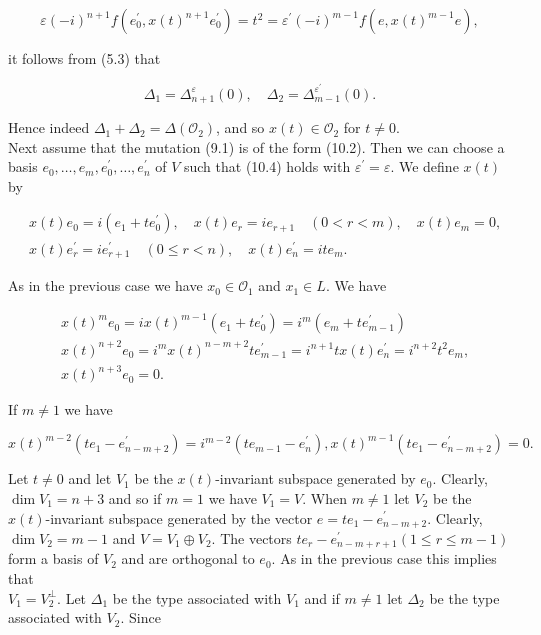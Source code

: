 \documentclass[10pt]{article}
\begin{document}
$$
\varepsilon(-i)^{n+1} f\left(e_{0}^{\prime}, x(t)^{n+1} e_{0}^{\prime}\right)=t^{2}=\varepsilon^{\prime}(-i)^{m-1} f\left(e, x(t)^{m-1} e\right),
$$

it follows from (5.3) that

$$
\Delta_{1}=\Delta_{n+1}^{\varepsilon}(0), \quad \Delta_{2}=\Delta_{m-1}^{\varepsilon^{\prime}}(0) .
$$

Hence indeed $\Delta_{1}+\Delta_{2}=\Delta\left(\mathcal{O}_{2}\right)$, and so $x(t) \in \mathcal{O}_{2}$ for $t \neq 0$.\\
Next assume that the mutation (9.1) is of the form (10.2). Then we can choose a basis $e_{0}, \ldots, e_{m}, e_{0}^{\prime}, \ldots, e_{n}^{\prime}$ of $V$ such that (10.4) holds with $\varepsilon^{\prime}=\varepsilon$. We define $x(t)$ by

$$
\begin{aligned}
& x(t) e_{0}=i\left(e_{1}+t e_{0}^{\prime}\right), \quad x(t) e_{r}=i e_{r+1} \quad(0<r<m), \quad x(t) e_{m}=0, \\
& x(t) e_{r}^{\prime}=i e_{r+1}^{\prime} \quad(0 \leqslant r<n), \quad x(t) e_{n}^{\prime}=i t e_{m} .
\end{aligned}
$$

As in the previous case we have $x_{0} \in \mathcal{O}_{1}$ and $x_{1} \in L$. We have

$$
\begin{aligned}
& x(t)^{m} e_{0}=i x(t)^{m-1}\left(e_{1}+t e_{0}^{\prime}\right)=i^{m}\left(e_{m}+t e_{m-1}^{\prime}\right) \\
& x(t)^{n+2} e_{0}=i^{m} x(t)^{n-m+2} t e_{m-1}^{\prime}=i^{n+1} t x(t) e_{n}^{\prime}=i^{n+2} t^{2} e_{m}, \\
& x(t)^{n+3} e_{0}=0 .
\end{aligned}
$$

If $m \neq 1$ we have

$$
x(t)^{m-2}\left(t e_{1}-e_{n-m+2}^{\prime}\right)=i^{m-2}\left(t e_{m-1}-e_{n}^{\prime}\right), x(t)^{m-1}\left(t e_{1}-e_{n-m+2}^{\prime}\right)=0 .
$$

Let $t \neq 0$ and let $V_{1}$ be the $x(t)$-invariant subspace generated by $e_{0}$. Clearly, $\operatorname{dim} V_{1}=n+3$ and so if $m=1$ we have $V_{1}=V$. When $m \neq 1$ let $V_{2}$ be the $x(t)$-invariant subspace generated by the vector $e=t e_{1}-e_{n-m+2}^{\prime}$. Clearly, $\operatorname{dim} V_{2}=m-1$ and $V=V_{1} \oplus V_{2}$. The vectors $t e_{r}-e_{n-m+r+1}^{\prime}(1 \leqslant r \leqslant m-1)$ form a basis of $V_{2}$ and are orthogonal to $e_{0}$. As in the previous case this implies that\\
$V_{1}=V_{2}^{\perp}$. Let $\Delta_{1}$ be the type associated with $V_{1}$ and if $m \neq 1$ let $\Delta_{2}$ be the type associated with $V_{2}$. Since
\end{document}
